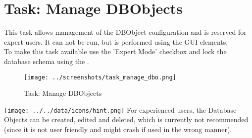 \section{Task: Manage DBObjects}
\label{sec:manage_dbobjects}

This task allows management of the DBObject configuration and is reserved for expert users. It can not be run, but is performed using the GUI elements. \\

To make this task available use the 'Expert Mode' checkbox and lock the database schema using the .

\begin{figure}[H]
  \hspace*{-2.5cm}
    \texttt{[image: ../screenshots/task\_manage\_dbo.png]}
  \caption{Task: Manage DBObjects}
\end{figure}


\texttt{[image: ../../data/icons/hint.png]} For experienced users, the Database Objects can be created, edited and deleted, which is currently not recommended (since it is not user friendly and might crash if used in the wrong manner).

 

